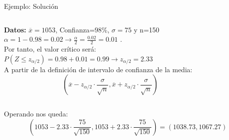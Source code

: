 \documentclass[11pt,handout]{beamer}
\begin{document}
\begin{frame}{Ejemplo: Solución}
\begin{columns}
\begin{column}{0.5\textwidth}
    \textbf{Datos:} $\overline{x}=1053$, Confianza=$98$\%, $\sigma=75$ y n=150 \\
    $\alpha=1-0.98=0.02 \to \frac{\alpha}{2}=\frac{0.02}{2}=0.01$
    . \\ Por tanto, el valor crítico será: \\
    $P\left(Z \leqslant z_{\alpha / 2} \right)= 0.98 + 0.01 = 0.99 \to z_{\alpha / 2} = 2.33$ \\
    A partir de la definición de intervalo de confianza de la media:
    $$ \left( \overline{x} - z_{\alpha / 2}\cdot \frac{\sigma}{\sqrt{n}} ,  \overline{x} + z_{\alpha / 2}\cdot \frac{\sigma}{\sqrt{n}}
    \right)$$

\end{column}
\begin{column}{0.5\textwidth}
    
\end{column}
\end{columns}
    
    Operando nos queda:
    $$ \left( 1053 - 2.33 \cdot \frac{75}{\sqrt{150}} ,  1053 + 2.33 \cdot \frac{75}{\sqrt{150}}
    \right)=\left(1038.73 ,  1067.27\right)
    $$
\end{frame}
\end{document}

